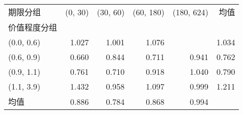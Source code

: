 \begin{tabular}{lrrrrr}
\toprule
期限分组 &  (0, 30) &  (30, 60) &  (60, 180) &  (180, 624) &  均值 \\
价值程度分组 &          &           &            &             &       \\
\midrule
(0.0, 0.6)    &    1.027 &     1.001 &      1.076 &             & 1.034 \\
(0.6, 0.9)    &    0.660 &     0.844 &      0.711 &       0.941 & 0.762 \\
(0.9, 1.1)    &    0.761 &     0.710 &      0.918 &       1.040 & 0.790 \\
(1.1, 3.9)    &    1.432 &     0.958 &      1.097 &       0.999 & 1.211 \\
均值          &    0.886 &     0.784 &      0.868 &       0.994 &       \\
\bottomrule
\end{tabular}
